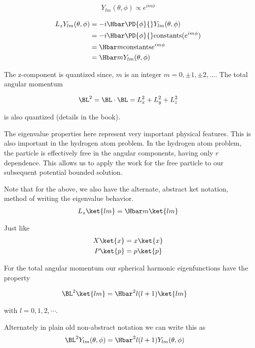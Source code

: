 \begin{align}\label{eqn:PHY356Foct19:1004}
Y_{lm}(\theta, \phi) \propto e^{i m \phi}
\end{align}

\begin{align*}
L_z Y_{lm}(\theta, \phi)
&= -i \Hbar \PD{\phi}{} Y_{lm}(\theta, \phi) \\
&= -i \Hbar \PD{\phi}{} \text{constants} (e^{im \phi}) \\
&= \Hbar m \text{constants} e^{i m \phi} \\
&= \Hbar m Y_{lm}(\theta, \phi)
\end{align*}

The z-component is quantized since, $m$ is an integer $m = 0, \pm 1, \pm 2, ...$.  The total angular momentum

\begin{align}\label{eqn:PHY356Foct19:1005}
\BL^2 = \BL \cdot \BL = L_x^2 + L_y^2 + L_z^2
\end{align}

is also quantized (details in the book).

The eigenvalue properties here represent very important physical features.  This is also important in the hydrogen atom problem.  In the hydrogen atom problem, the particle is effectively free in the angular components, having only $r$ dependence.  This allows us to apply the work for the free particle to our subsequent potential bounded solution.

Note that for the above, we also have the alternate, abstract ket notation, method of writing the eigenvalue behavior.
\begin{align}\label{eqn:PHY356Foct19:1006}
L_z \ket{lm} = \Hbar m \ket{lm}
\end{align}

Just like
\begin{align}\label{eqn:PHY356Foct19:1007}
X \ket{x} &= x \ket{x} \\
P \ket{p} &= p \ket{p}
\end{align}

For the total angular momentum our spherical harmonic eigenfunctions have the property

\begin{align}\label{eqn:PHY356Foct19:1008}
\BL^2 \ket{lm} &= \Hbar^2 l (l + 1)\ket{l m}
\end{align}

with $l = 0, 1, 2, \cdots$.

Alternately in plain old non-abstract notation we can write this as
\begin{align}\label{eqn:PHY356Foct19:1009}
\BL^2 Y_{lm}(\theta, \phi) &= \Hbar^2 l (l + 1) Y_{lm}(\theta, \phi)
\end{align}

